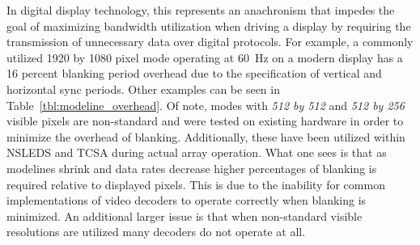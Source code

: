     In digital display technology, this represents an anachronism that impedes the goal of maximizing bandwidth utilization when driving a display by requiring the transmission of unnecessary data over digital protocols. For example, a commonly utilized 1920 by 1080 pixel mode operating at \mbox{60 Hz}\cite{MythTVWebsite} on a modern display has a 16 percent blanking period overhead due to the specification of vertical and horizontal sync periods. Other examples can be seen in Table~\ref{tbl:modeline_overhead}. Of note, modes with {\it 512 by 512} and {\it 512 by 256} visible pixels are non-standard and were tested on existing hardware in order to minimize the overhead of blanking. Additionally, these have been utilized within NSLEDS and TCSA during actual array operation. What one sees is that as modelines shrink and data rates decrease higher percentages of blanking is required relative to displayed pixels. This is due to the inability for common implementations of video decoders to operate correctly when blanking is minimized. An additional larger issue is that when non-standard visible resolutions are utilized many decoders do not operate at all.

